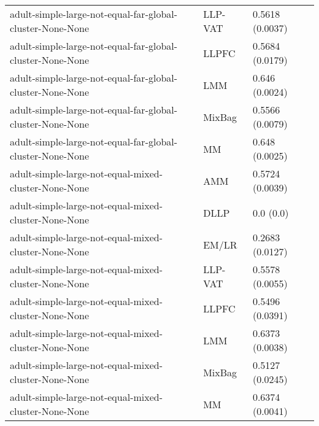 \begin{longtable}{lll}
                                                    adult-simple-large-not-equal-far-global-cluster-None-None &   LLP-VAT &                           0.5618 (0.0037) \\
                                                    adult-simple-large-not-equal-far-global-cluster-None-None &     LLPFC &                           0.5684 (0.0179) \\
                                                    adult-simple-large-not-equal-far-global-cluster-None-None &       LMM &                            0.646 (0.0024) \\
                                                    adult-simple-large-not-equal-far-global-cluster-None-None &    MixBag &                           0.5566 (0.0079) \\
                                                    adult-simple-large-not-equal-far-global-cluster-None-None &        MM &                            0.648 (0.0025) \\
                                                         adult-simple-large-not-equal-mixed-cluster-None-None &       AMM &                           0.5724 (0.0039) \\
                                                         adult-simple-large-not-equal-mixed-cluster-None-None &      DLLP &                                 0.0 (0.0) \\
                                                         adult-simple-large-not-equal-mixed-cluster-None-None &     EM/LR &                           0.2683 (0.0127) \\
                                                         adult-simple-large-not-equal-mixed-cluster-None-None &   LLP-VAT &                           0.5578 (0.0055) \\
                                                         adult-simple-large-not-equal-mixed-cluster-None-None &     LLPFC &                           0.5496 (0.0391) \\
                                                         adult-simple-large-not-equal-mixed-cluster-None-None &       LMM &                           0.6373 (0.0038) \\
                                                         adult-simple-large-not-equal-mixed-cluster-None-None &    MixBag &                           0.5127 (0.0245) \\
                                                         adult-simple-large-not-equal-mixed-cluster-None-None &        MM &                           0.6374 (0.0041) \\

\end{longtable}
